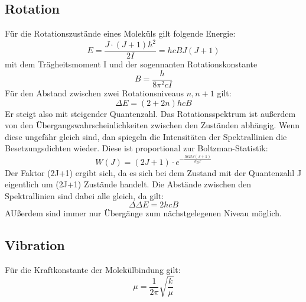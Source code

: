 \documentclass[11pt]{article}
\begin{document}
\subsection{Rotation}
Für die Rotationszustände eines Moleküls gilt folgende Energie:
\begin{equation}
  E=\frac{J\cdot(J+1)\hbar^2}{2I}=hcBJ(J+1)
\end{equation}
mit dem Trägheitsmoment I und der sogennanten Rotationskonstante
\begin{equation}
  B=\frac{h}{8\pi^2cI}
\end{equation}
Für den Abstand zwischen zwei Rotationsniveaus $n, n+1$ gilt:
\begin{equation}
  \Delta E=(2+2n)hcB
\end{equation}
Er steigt also mit steigender Quantenzahl. Das Rotationsspektrum ist außerdem
von den Übergangswahrscheinlichkeiten zwischen den Zuständen abhängig. Wenn
diese ungefähr gleich sind, dan spiegeln die Intensitäten der Spektrallinien
die Besetzungsdichten wieder. Diese ist proportional zur Boltzman-Statistik:
\begin{equation}
  W(J)=(2J+1)\cdot e^{-\frac{hcBJ(J+1)}{k_BT}}
\end{equation}
Der Faktor (2J+1) ergibt sich, da es sich bei dem Zustand mit der Quantenzahl J
eigentlich um (2J+1) Zustände handelt. Die Abstände zwischen den Spektrallinien
sind dabei alle gleich, da gilt:
\begin{equation}
  \Delta\Delta E=2hcB
\end{equation}
AUßerdem sind immer nur Übergänge zum nächstgelegenen Niveau möglich.

\subsection{Vibration}
Für die Kraftkonstante der Molekülbindung gilt:
\begin{equation}
  \mu=\frac{1}{2\pi}\sqrt{\frac{k}{\mu}}
\end{equation}
\end{document}
